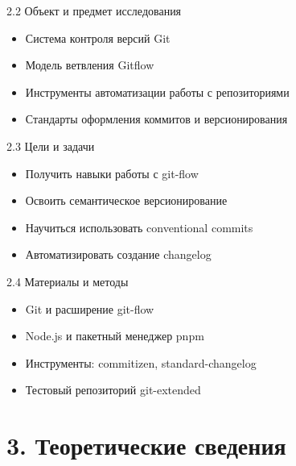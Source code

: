 \documentclass[
  ignorenonframetext,
  aspectratio=169,
  russian,
]{beamer}
\providecommand{\tightlist}{%
  \setlength{\itemsep}{0pt}\setlength{\parskip}{0pt}}
\begin{document}
\begin{frame}{2.2 Объект и предмет исследования}
\label{ux43eux431ux44aux435ux43aux442-ux438-ux43fux440ux435ux434ux43cux435ux442-ux438ux441ux441ux43bux435ux434ux43eux432ux430ux43dux438ux44f}
\begin{itemize}[<+->]
\tightlist
\item
  Система контроля версий Git
\item
  Модель ветвления Gitflow
\item
  Инструменты автоматизации работы с репозиториями
\item
  Стандарты оформления коммитов и версионирования
\end{itemize}
\end{frame}

\begin{frame}{2.3 Цели и задачи}
\label{ux446ux435ux43bux438-ux438-ux437ux430ux434ux430ux447ux438}
\begin{itemize}[<+->]
\tightlist
\item
  Получить навыки работы с git-flow
\item
  Освоить семантическое версионирование
\item
  Научиться использовать conventional commits
\item
  Автоматизировать создание changelog
\end{itemize}
\end{frame}

\begin{frame}{2.4 Материалы и методы}
\label{ux43cux430ux442ux435ux440ux438ux430ux43bux44b-ux438-ux43cux435ux442ux43eux434ux44b}
\begin{itemize}[<+->]
\tightlist
\item
  Git и расширение git-flow
\item
  Node.js и пакетный менеджер pnpm
\item
  Инструменты: commitizen, standard-changelog
\item
  Тестовый репозиторий git-extended
\end{itemize}
\end{frame}

\section{3. Теоретические
сведения}\label{ux442ux435ux43eux440ux435ux442ux438ux447ux435ux441ux43aux438ux435-ux441ux432ux435ux434ux435ux43dux438ux44f}
\end{document}
